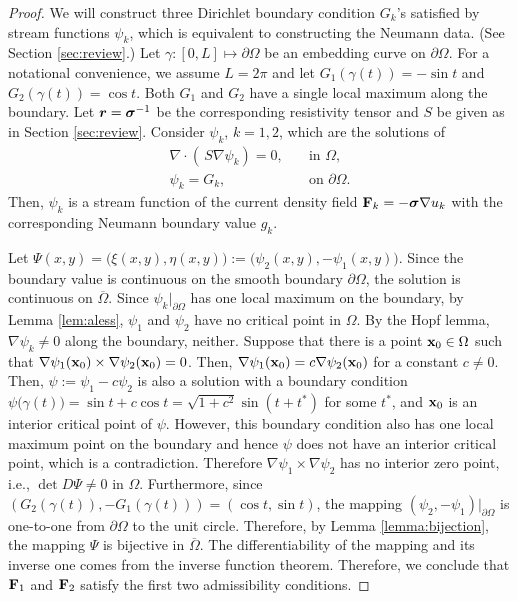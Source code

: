 \documentclass[11pt]{amsart}
\theoremstyle{plain}
\theoremstyle{remark}
\numberwithin{equation}{section}
\numberwithin{Thm}{section}
\def\F{{\bf F}}
\def\r{{\bf r}}
\def\x{{\bf x}}
\def\ds{\displaystyle}
\def\Sigma{\mbox{\boldmath$\sigma$}}
\def\r{\mbox{\boldmath$r$}}
\begin{document}
\begin{proof}  We will construct three Dirichlet boundary condition $G_k$'s satisfied by stream functions $\psi_k$, which is equivalent to constructing the Neumann data. (See Section \ref{sec:review}.) Let $\gamma:[0, L] \mapsto \partial\Omega$ be an embedding curve on $\partial\Omega$. For a notational convenience, we assume $L=2\pi$ and let $G_1(\gamma(t))=-\sin t$ and $G_2(\gamma(t))=\cos t$. Both $G_1$ and $G_2$ have a single local maximum along the boundary. Let $\r=\Sigma^{-1}$ be the corresponding resistivity tensor and $S$ be given as in Section \ref{sec:review}. Consider $\psi_k$, $k=1,2$, which are the solutions of
\begin{equation}\label{Eqn3.3}
\begin{array}{cc}\ds
 \nabla\cdot(\,S\nabla \psi_k)  =0, &\quad \text{in $\Omega$},\\
 \psi_k=G_k, &\quad \text{on $\partial\Omega$}.
\end{array}
\end{equation}
Then, $\psi_k$ is a stream function of the current density field $\F_k = -\Sigma\nabla u_k$ with the corresponding Neumann boundary value $g_k$.  

Let $\Psi(x,y)= \big(\xi(x,y),\eta(x,y)\big):=\big(\psi_2(x,y), -\psi_1(x,y)\big)$. Since the boundary value is continuous on the smooth boundary $\partial\Omega$, the solution is continuous on $\overline\Omega$. Since $\psi_k|_{\partial\Omega}$ has one local maximum on the boundary, by Lemma \ref{lem:aless}, $\psi_1$ and $\psi_2$ have no critical point in $\Omega$. By the Hopf lemma, $\nabla\psi_k \ne 0$ along the boundary, neither. Suppose that there is a point $\x_0 \in \Omega$ such that $\nabla\psi_1(\x_0) \times \nabla\psi_2(\x_0) =0$. Then, $\nabla\psi_1(\x_0) = c \nabla\psi_2(\x_0)$ for a constant $c\ne0$. Then, $\psi := \psi_1 - c\psi_2$  is also a solution with a boundary condition $\psi\big(\gamma(t)\big) = \sin t + c\cos t =\sqrt{1+c^2} \sin(t+t^*)$ for some $t^*$, and $\x_0$ is an interior critical point of $\psi$. However, this boundary condition also has one local maximum point on the boundary and hence $\psi$ does not have an interior critical point, which is a contradiction. Therefore $\nabla\psi_1 \times \nabla\psi_2$  has no interior zero point, i.e., $\det D\Psi\ne0$ in $\Omega$. Furthermore, since $(G_2(\gamma(t)),-G_1(\gamma(t))) = (\cos t, \sin t)$, the mapping $(\psi_2,-\psi_1)|_{\partial \Omega}$ is one-to-one from $\partial\Omega$ to the unit circle. Therefore, by Lemma \ref{lemma:bijection}, the mapping $\Psi$ is bijective in $\overline\Omega$. The differentiability of the mapping and its inverse one comes from the inverse function theorem. Therefore, we conclude that $\F_1$ and $\F_2$ satisfy the first two admissibility conditions.


\end{proof}
\end{document}
